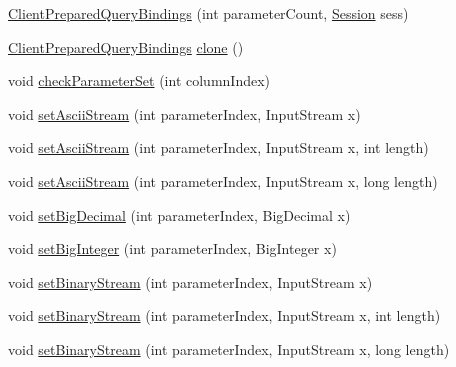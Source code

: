 \begin{DoxyCompactItemize}
\item 
\mbox{\hyperlink{classcom_1_1mysql_1_1cj_1_1_client_prepared_query_bindings_a24a654df72e47f172b612ede005bb5f7}{Client\+Prepared\+Query\+Bindings}} (int parameter\+Count, \mbox{\hyperlink{interfacecom_1_1mysql_1_1cj_1_1_session}{Session}} sess)
\item 
\mbox{\hyperlink{classcom_1_1mysql_1_1cj_1_1_client_prepared_query_bindings}{Client\+Prepared\+Query\+Bindings}} \mbox{\hyperlink{classcom_1_1mysql_1_1cj_1_1_client_prepared_query_bindings_a14bd0847e398f76101cabf93a519d00d}{clone}} ()
\item 
void \mbox{\hyperlink{classcom_1_1mysql_1_1cj_1_1_client_prepared_query_bindings_ae597bd90c3bf9ae2e19affe14ab6f528}{check\+Parameter\+Set}} (int column\+Index)
\item 
void \mbox{\hyperlink{classcom_1_1mysql_1_1cj_1_1_client_prepared_query_bindings_ac39a07b451818ab7b718b6ed8905da12}{set\+Ascii\+Stream}} (int parameter\+Index, Input\+Stream x)
\item 
void \mbox{\hyperlink{classcom_1_1mysql_1_1cj_1_1_client_prepared_query_bindings_a936d2a19ea061babd9b5f5b783093891}{set\+Ascii\+Stream}} (int parameter\+Index, Input\+Stream x, int length)
\item 
void \mbox{\hyperlink{classcom_1_1mysql_1_1cj_1_1_client_prepared_query_bindings_aeddc294602a883d8af5041ee5927cc63}{set\+Ascii\+Stream}} (int parameter\+Index, Input\+Stream x, long length)
\item 
void \mbox{\hyperlink{classcom_1_1mysql_1_1cj_1_1_client_prepared_query_bindings_ab091a0e17e3f00c749fe6ea30ef96cf8}{set\+Big\+Decimal}} (int parameter\+Index, Big\+Decimal x)
\item 
void \mbox{\hyperlink{classcom_1_1mysql_1_1cj_1_1_client_prepared_query_bindings_a9b31e57902142b994e6141ea6ef2cbf8}{set\+Big\+Integer}} (int parameter\+Index, Big\+Integer x)
\item 
void \mbox{\hyperlink{classcom_1_1mysql_1_1cj_1_1_client_prepared_query_bindings_a146bdb0d69f1f5feeed8bee6436380cd}{set\+Binary\+Stream}} (int parameter\+Index, Input\+Stream x)
\item 
void \mbox{\hyperlink{classcom_1_1mysql_1_1cj_1_1_client_prepared_query_bindings_aeadaebeff151379e6d164ccfdf7de121}{set\+Binary\+Stream}} (int parameter\+Index, Input\+Stream x, int length)
\item 
void \mbox{\hyperlink{classcom_1_1mysql_1_1cj_1_1_client_prepared_query_bindings_aa6118fd2273e567c6d409b5c0504464b}{set\+Binary\+Stream}} (int parameter\+Index, Input\+Stream x, long length)

\end{DoxyCompactItemize}
